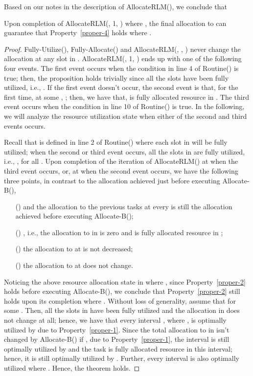 \documentclass[10pt,journal,compsoc]{IEEEtran}
\newcommand{\rmnum}[1]{\romannumeral #1}
\begin{document}
Based on our notes in the description of AllocateRLM(), we conclude that
\begin{proposition}\label{theo-structure}
Upon completion of AllocateRLM(, 1, ) where , the final allocation to  can guarantee that Property~\ref{proper-4} holds where .
\end{proposition}
\begin{proof}
Fully-Utilize(), Fully-Allocate() and AllocateRLM(, , ) never change the allocation at any slot in . AllocateRLM(, 1, ) ends up with one of the following four events. The first event occurs when the condition in line 4 of Routine() is true; then, the proposition holds trivially since all the slots  have been fully utilized, i.e., . If the first event doesn't occur, the second event is that, for the first time, at some , ; then, we have that,  is fully allocated  resource in . The third event occurs when the condition in line 10 of Routine() is true. In the following, we will analyze the resource utilization state when either of the second and third events occurs.

Recall that  is defined in line 2 of Routine() where each slot in  will be fully utilized; when the second or third event occurs, all the slots in  are fully utilized, i.e., , for all . Upon completion of the iteration of AllocateRLM() at  when the third event occurs, or, at  when the second event occurs, we have the following three points, in contrast to the allocation achieved just before executing Allocate-B(),
\begin{enumerate}
 \setlength\itemsep{0.1em}
\item [(\rmnum{1})]  and the allocation to the previous tasks  at every  is still the allocation achieved before executing Allocate-B();

\item [(\rmnum{2})] , i.e., the allocation to  in  is zero and  is fully allocated  resource in ;

\item [(\rmnum{3})] the allocation to  at  is not decreased;

\item [(\rmnum{4})] the allocation to  at  does not change.
\end{enumerate}
Noticing the above resource allocation state in  where , since Property~\ref{proper-2} holds before executing Allocate-B(), we conclude that Property~\ref{proper-2} still holds upon its completion where . Without loss of generality, assume that  for some . Then, all the slots in  have been fully utilized and the allocation in  does not change at all; hence, we have that every interval , where , is optimally utilized by  due to Property~\ref{proper-1}. Since the total allocation to  in  isn't changed by Allocate-B() if , due to Property~\ref{proper-1}, the interval  is still optimally utilized by  and the task  is fully allocated  resource in this interval; hence, it is still optimally utilized by . Further, every interval  is also optimally utilized where . Hence, the theorem holds.



\end{proof}
\end{document}
